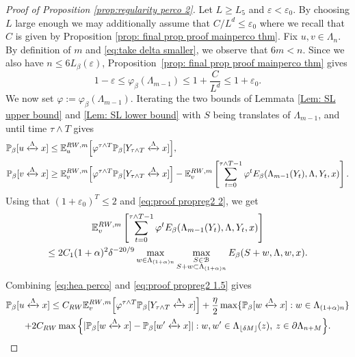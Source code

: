 \documentclass[11pt,a4paper]{article}
\numberwithin{equation}{section}
\theoremstyle{plain}
\theoremstyle{definition}
\newcommand{\connect}{\xleftrightarrow}
\begin{document}
\begin{proof}[Proof of Proposition \textup{\ref{prop:regularity perco 2}}]
Let $L\geq L_5$ and $\varepsilon<\varepsilon_0$. By choosing $L$ large enough we may additionally assume that $C/L^d\leq \varepsilon_0$ where we recall that $C$ is given by Proposition \ref{prop: final prop proof mainperco thm}. Fix $u,v\in \Lambda_n$. By definition of $m$ and \eqref{eq:take delta smaller}, we observe that $6m<n$. Since we also have $n\le 6L_\beta(\varepsilon)$, Proposition~\ref{prop: final prop proof mainperco thm} gives
\begin{equation}
1-\varepsilon\le \varphi_\beta(\Lambda_{m-1})\le 1+\frac{C}{L^d}\le 1+\varepsilon_0.
\end{equation}
We now set $\varphi:=\varphi_\beta(\Lambda_{m-1})$. Iterating the two bounds of Lemmata \ref{Lem: SL upper bound} and \ref{Lem: SL lower bound} with $S$ being translates of $\Lambda_{m-1}$, and until time $\tau\wedge T$ gives \begin{align}
\mathbb P_\beta[u\connect{\Lambda\:}x]&\le  \mathbb E_{u}^{{\rm RW},m}\Big[\varphi^{\tau\wedge T} \mathbb P_\beta[Y_{\tau\wedge T}\connect{\Lambda\:}x]\Big],\label{eq:hea perco}\\
\mathbb P_\beta[v\connect{\Lambda\:}x]&\ge \mathbb E_{v}^{{\rm RW},m}\Big[\varphi^{\tau\wedge T} \mathbb P_\beta[Y_{\tau\wedge T}\connect{\Lambda\:}x]\Big]-\mathbb E_{v}^{{\rm RW},m}\left[\sum_{t=0}^{\tau\wedge T-1}\varphi^t{E}_\beta(\Lambda_{m-1}(Y_t),\Lambda,Y_t,x)\right].\label{eq:hda perco}
\end{align}
Using that $(1+\varepsilon_0)^T\leq 2$ and \eqref{eq:proof propreg2 2}, we get
\begin{multline}\label{eq:proof propref2 2.5}
	\mathbb E_{v}^{{\rm RW},m}\left[\sum_{t=0}^{\tau\wedge T-1}\varphi^t{E}_\beta(\Lambda_{m-1}(Y_t),\Lambda,Y_t,x)\right]\\\leq 2C_1(1+\alpha)^2\delta^{-20/9}\max_{w\in \Lambda_{(1+\alpha)n}}\max_{\substack{S\in \mathcal B\\S+w\subset \Lambda_{(1+\alpha)n}}}{E}_\beta(S+w, \Lambda,w,x).
\end{multline}
Combining \eqref{eq:hea perco} and \eqref{eq:proof propreg2 1.5} gives
\begin{multline}\label{eq:proof propreg2 3}
	\mathbb P_\beta[u\connect{\Lambda\:}x]\leq C_{\rm RW}\mathbb E_v^{{\rm RW},m}\Big[\varphi^{\tau\wedge T}\mathbb P_\beta[Y_{\tau \wedge T}\connect{\Lambda\:}x]\Big]+\frac{\eta}{2}\max\{\mathbb P_\beta[w\connect{\Lambda\:}x]:w\in \Lambda_{(1+\alpha)n}\}\\+2C_{\rm RW}\max \Big\{|\mathbb P_\beta[w\connect{\Lambda\:}x]-\mathbb P_\beta[w'\connect{\Lambda\:}x]|: w,w'\in \Lambda_{\lfloor \delta M\rfloor}(z), \: z\in \partial \Lambda_{n+M}\Big\}. 

\end{multline}
\end{proof}
\end{document}
